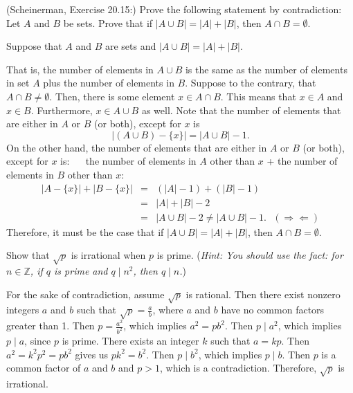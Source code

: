 \documentclass{article}
\newcommand{\Z}{\mathbb{Z}}
\theoremstyle{definition}
\begin{document}
\begin{question}
    (Scheinerman, Exercise 20.15:)
    Prove the following statement by contradiction:\\ Let $A$ and $B$ be sets.  Prove that if $|A \cup B| = |A| + |B|$, then $A\cap B = \emptyset$.
\end{question}
\begin{solution}
Suppose that $A$ and $B$ are sets and $|A \cup B | = |A| + |B|$.

That is, the number of elements in $A \cup B$ is the same as the number of elements in set $A$ plus the number of elements in $B$. 
Suppose to the contrary, that $A \cap B \neq \emptyset$. 
Then, there is some element $x \in A \cap B$.  This means that $x \in A$ and $x \in B$.  Furthermore, $x \in A \cup B$ as well. 
Note that the number of elements that are either in $A$ or $B$ (or both), except for $x$ is
\[ |(A \cup B) - \{x\}| = |A \cup B| - 1. \]
On the other hand, the number of elements that are either in $A$ or $B$ (or both), except for $x$ is: ~~ the number of elements in $A$ other than $x$ + the number of elements in $B$ other than $x$:
\begin{eqnarray*}
|A - \{x\}| + |B - \{x\}| & = & (|A| - 1) + (|B| - 1) \\
	& = & |A| + |B| - 2 \\
	& = & |A \cup B| - 2 \neq |A \cup B| - 1.  ~~~ (\Rightarrow\Leftarrow)
\end{eqnarray*}
Therefore, it must be the case that if $|A \cup B | = |A| + |B|$, then $A \cap B = \emptyset$.
\end{solution}

\begin{question}
    Show that $\sqrt{p}$ is irrational when $p$ is prime. (\textit{Hint: You should use the fact: for $n\in \Z$, if $q$ is prime and $q\mid n^2$, then $q\mid n$.})
\end{question}
\begin{solution}
For the sake of contradiction, assume $\sqrt{p}$ is rational. Then there exist nonzero integers $a$ and $b$ such that $\sqrt{p}=\frac{a}{b}$, where $a$ and $b$ have no common factors greater than 1. Then $p=\frac{a^2}{b^2}$, which implies $a^2 = pb^2$. Then $p\mid a^2$, which implies $p\mid a$, since $p$ is prime. There exists an integer $k$ such that $a=kp$. Then $a^2 = k^2p^2= pb^2$ gives us $pk^2 = b^2$. Then $p\mid b^2$, which implies $p\mid b$. Then $p$ is a common factor of $a$ and $b$ and $p>1$, which is a contradiction. Therefore, $\sqrt{p}$ is irrational.
\end{solution}
\end{document}
